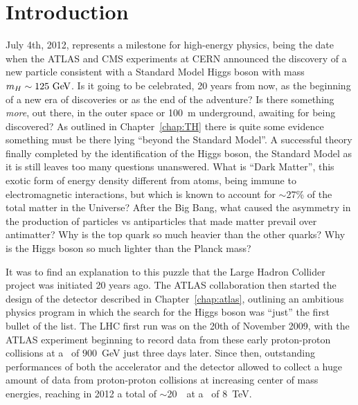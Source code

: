 \clearpage{\pagestyle{empty}\cleardoublepage}

\chapter*{Introduction}\label{chap:intro}


July 4th, 2012, represents a milestone for high-energy physics,
being the date when the ATLAS and CMS experiments at CERN announced
the discovery of a new particle consistent with a Standard Model Higgs
boson with mass $m_H\sim 125\gev$. Is it going to be celebrated, 20 years
from now, as the beginning of a new era of discoveries or as the 
end of the adventure? Is there something {\it more}, out there, in 
the outer space or 100~m underground, awaiting for being discovered?
As outlined in Chapter~\ref{chap:TH} there is quite some evidence
something must be there lying ``beyond the Standard Model''. 
A successful theory finally completed
by the identification of the Higgs boson, 
the Standard Model as it is still leaves too many questions
unanswered. What is ``Dark Matter'', this exotic form of energy density different
from atoms, being immune to electromagnetic interactions, but which
is known to account for $\sim$27\% of the total matter in the Universe?
After the Big Bang, what caused the asymmetry in the production of particles vs
antiparticles that made matter prevail over antimatter?
Why is the top quark so much heavier than the other quarks? Why is the
Higgs boson so much lighter than the Planck mass?

It was to find an explanation to this puzzle that the 
Large Hadron Collider project was initiated 20 years ago. The ATLAS
collaboration then started the design of the detector described in
Chapter~\ref{chap:atlas}, outlining an ambitious physics program
in which the search for the Higgs boson was ``just'' the first bullet
of the list.
The LHC first run was on the 20th of November 2009, with the ATLAS
experiment beginning to record data from these early proton-proton
collisions at a \cme\ of $900$~GeV just three days later.
Since then, outstanding performances of both the accelerator
and the detector allowed to collect a huge amount of data
from proton-proton collisions at increasing center of mass energies, reaching in
2012 a total of $\sim$20~\ifb\ at a \cme\ of 8~TeV.

